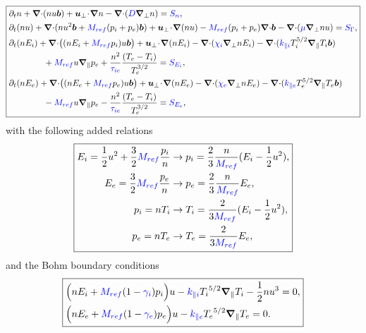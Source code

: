 \documentclass[a4paper,10pt]{article}
\newcommand{\bm}[1]{\text{\boldmath$#1$\unboldmath}}
\newcommand{\scal}{\! \cdot \! }
\newcommand{\bu}{\bm{u}}
\newcommand{\Div}{{\bm{\nabla}\cdot}}
\newcommand{\Grad}{\bm{\nabla}}
\renewcommand{\b}{\bm{b}}
\newcommand{\qq}{\qquad\qquad}
\newcommand{\Gradpar}{\Grad_{\parallel}}
\newcommand{\Gradper}{\Grad_{\perp}}
\newcommand{\Gm}{\Gamma}
\newcommand{\nd}[1]{{\color{blue} #1\color{black}}} %
\def\Mref{\nd{M_{ref}}}
\def\kpai{\nd{k_{\parallel i}}}
\def\kpae{\nd{k_{\parallel e}}}
\def\drhoa{\nd{D}}
\def\dcona{\nd{\mu}}
\def\deneai{\nd{\chi_i}}
\def\deneae{\nd{\chi_e}}
\def\tiea{\nd{\tau_{ie}}}
\begin{document}
\begin{equation}\label{eq:sys-ad}
\boxed{
\begin{aligned}
 &\partial_tn + \Div (nu\b) + \bu_\bot\scal \Grad n  -  \Div ( \drhoa \Gradper n) =  \nd{S_n},\\
&\partial_t (nu)  + \Div (nu^2\b  + \Mref (p_i+p_e)\b) + \bu_\bot\scal \Grad(nu) -   \Mref (p_i+p_e)\Div\b - \Div (\dcona \Gradper nu) =\nd{S_{\Gm}},\\
&\partial_t (nE_i)  + \Div \big( (nE_i+ \Mref p_i)u\b  \big)+\bu_\bot\scal \Grad(nE_i) - \Div (\deneai \Gradper nE_i) -\Div (\kpai T_i^{5/2}\Gradpar T_i\b)\\ &\qq+\Mref u\Gradpar p_e+\frac{n^2}{\tiea}\frac{(T_e-T_i)}{T_e^{3/2}} = \nd{S_{E_i}}, \\
&\partial_t (nE_e)  + \Div \big( (nE_e+ \Mref p_e)u\b  \big)+\bu_\bot\scal \Grad(nE_e) - \Div (\deneae \Gradper nE_e) -\Div (\kpae T_e^{5/2}\Gradpar T_e\b)\\ &\qq-\Mref u\Gradpar p_e-\frac{n^2}{\tiea}\frac{(T_e-T_i)}{T_e^{3/2}} = \nd{S_{E_e}},  
\end{aligned}
}
\end{equation}
with the following added relations
\begin{equation*}
\boxed{
\begin{aligned}
 E_i = \frac{1}{2}u^2+\frac{3}{2} \Mref \frac{p_i}{n}& \rightarrow p_i=\frac{2}{3}\frac{n}{ \Mref }(E_i-\frac{1}{2}u^2),\\
 E_e = \frac{3}{2} \Mref \frac{p_e}{n}& \rightarrow p_e=\frac{2}{3}\frac{n}{ \Mref }E_e,\\ 
  p_i=nT_i & \rightarrow T_i=\frac{2}{3  \Mref } (E_i-\frac{1}{2}u^2),\\
  p_e=nT_e & \rightarrow T_e=\frac{2}{3  \Mref } E_e,
\end{aligned}
}
\end{equation*}
and the Bohm boundary conditions
\begin{equation*}
\boxed{
\begin{aligned}
 &\Big(n E_i + \Mref (1-\nd{\gamma_i}) p_i \Big) u -  \kpai {T_i}^{5/2}\Gradpar T_i -  \frac{1}{2} n u^3 = 0,\\
 &\Big(n E_e + \Mref (1-\nd{\gamma_e}) p_e \Big) u -  \kpae {T_e}^{5/2}\Gradpar T_e = 0.
\end{aligned}
}
\end{equation*}
\end{document}
